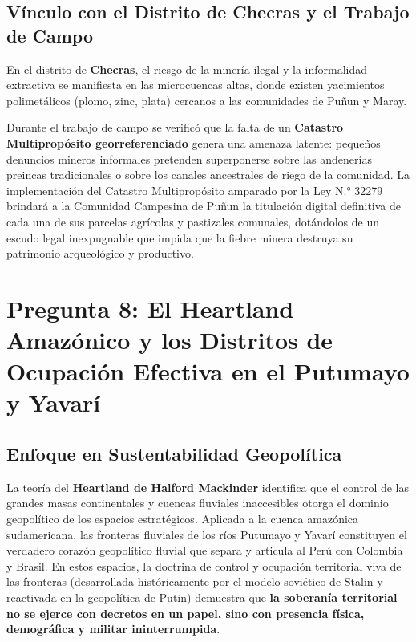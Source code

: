\documentclass[11pt,a4paper]{article}
\begin{document}
\subsection{Vínculo con el Distrito de Checras y el Trabajo de Campo}
En el distrito de \textbf{Checras}, el riesgo de la minería ilegal y la informalidad extractiva se manifiesta en las microcuencas altas, donde existen yacimientos polimetálicos (plomo, zinc, plata) cercanos a las comunidades de Puñun y Maray.

Durante el trabajo de campo se verificó que la falta de un \textbf{Catastro Multipropósito georreferenciado} genera una amenaza latente: pequeños denuncios mineros informales pretenden superponerse sobre las andenerías preincas tradicionales o sobre los canales ancestrales de riego de la comunidad. La implementación del Catastro Multipropósito amparado por la Ley N.° 32279 brindará a la Comunidad Campesina de Puñun la titulación digital definitiva de cada una de sus parcelas agrícolas y pastizales comunales, dotándolos de un escudo legal inexpugnable que impida que la fiebre minera destruya su patrimonio arqueológico y productivo.


\newpage

\section{Pregunta 8: El Heartland Amazónico y los Distritos de Ocupación Efectiva en el Putumayo y Yavarí}

\subsection{Enfoque en Sustentabilidad Geopolítica}
La teoría del \textbf{Heartland de Halford Mackinder} identifica que el control de las grandes masas continentales y cuencas fluviales inaccesibles otorga el dominio geopolítico de los espacios estratégicos. Aplicada a la cuenca amazónica sudamericana, las fronteras fluviales de los ríos Putumayo y Yavarí constituyen el verdadero corazón geopolítico fluvial que separa y articula al Perú con Colombia y Brasil. En estos espacios, la doctrina de control y ocupación territorial viva de las fronteras (desarrollada históricamente por el modelo soviético de Stalin y reactivada en la geopolítica de Putin) demuestra que \textbf{la soberanía territorial no se ejerce con decretos en un papel, sino con presencia física, demográfica y militar ininterrumpida}.
\end{document}
